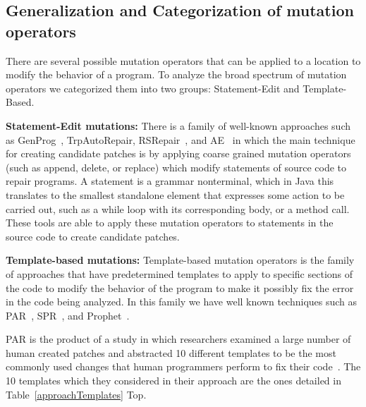 \documentclass[conference]{IEEEtran}
\begin{document}
\subsection{Generalization and Categorization of mutation operators} 
\label{categorization}

There are several possible mutation operators that can be applied to a location 
to modify the behavior of a program. To analyze the broad 
spectrum of mutation operators we categorized them into two groups: 
Statement-Edit and Template-Based. 

\textbf{Statement-Edit mutations:}
There is a family of well-known approaches such as GenProg~\cite{legoues12}, 
TrpAutoRepair\cite{Qi13}, RSRepair~\cite{Qi14}, and AE~\cite{Weimer13} in which the main technique for 
creating candidate 
patches is by applying coarse grained mutation operators (such as append, delete, or 
replace) which modify statements of source code to 
repair programs. A statement is  a grammar nonterminal, which in Java this translates to the smallest standalone element that expresses 
some action to be carried out, such as a while loop with its corresponding body, or a method call. These tools are able to 
apply these mutation operators to statements in the source code to 
create candidate patches.

\textbf{Template-based mutations:}
Template-based mutation operators is the family of approaches that have 
predetermined templates to apply to specific sections of the code to 
modify the behavior of the program to make it possibly fix the error in the 
code being analyzed. In this family we have well known techniques such as PAR~\cite{kim2013}, 
SPR~\cite{fan15}, and 
Prophet~\cite{Long2016}.
 
PAR is the product of a study in which researchers examined a large number of 
human 
created patches and abstracted 10 different templates to be the most 
commonly used changes that human programmers perform to fix their 
code~\cite{kim2013}.
The 10 templates which they considered in their approach are the ones detailed in Table~\ref{approachTemplates} Top.
\end{document}
